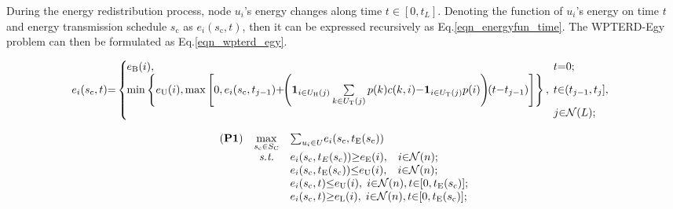 \documentclass[12pt,journal,onecolumn,draftcls]{IEEEtran}
\begin{document}
During the energy redistribution process, node $u_i$'s energy changes along time $t{\in}[0,t_{L}]$. Denoting the function of $u_i$'s energy on time $t$ and energy transmission schedule $s_\text{c}$ as $e_i(s_\text{c},t)$, then it can be expressed recursively as Eq.\eqref{eqn_energyfun_time}. The WPTERD-Egy problem can then be formulated as Eq.\eqref{eqn_wpterd_egy}.


\begin{figure}
\begin{equation}
\label{eqn_energyfun_time}
e_i(s_\text{c},t){=}\left\{
\begin{array}{ll}
\hspace{-2mm}e_\text{B}(i), \hspace{2mm}&\hspace{-2mm}t{=}0;\\
\hspace{-2mm}\min\left\{e_\text{U}(i),
\max\left[0,
e_i(s_\text{c},t_{j{-}1})
{+}\hspace{-1mm}\left(
\mathbf{1}_{i{\in}U_\text{H}(j)}
\mathop{\sum}\limits_{k{\in}U_\text{T}(j)}p(k)c(k,i)
{-}
\mathbf{1}_{i{\in}U_\text{T}(j)}p(i)
\right)
\hspace{-1mm}(t{-}t_{j{-}1})
\right]
\right\}
,&\hspace{-2mm}t{\in}(t_{j{-}1},t_j],\\
&\hspace{-2mm}j{\in}\mathcal{N}(L);
\end{array}
\right.
\end{equation}
\end{figure}


\begin{equation}
\label{eqn_wpterd_egy}
\begin{array}{rcl}
(\textbf{P1})&\mathop{\max}\limits_{s_\text{c}{\in}S_\text{C}}&{\sum}_{u_i{\in}U}e_i(s_\text{c},t_\text{E}(s_\text{c}))\\
&\textit{s.t.}&e_i(s_\text{c},t_E(s_\text{c})){\geq}e_\text{E}(i),\hspace{3mm}i{\in}\mathcal{N}(n);\\
&&e_i(s_\text{c},t_\text{E}(s_\text{c})){\leq}e_\text{U}(i),\hspace{3mm}i{\in}\mathcal{N}(n);\\
&&e_i(s_\text{c},t){\leq}e_\text{U}(i),\hspace{1mm}i{\in}\mathcal{N}(n),t{\in}[0,t_\text{E}(s_\text{c})];\\
&&e_i(s_\text{c},t){\geq}e_\text{L}(i),\hspace{1mm}i{\in}\mathcal{N}(n),t{\in}[0,t_\text{E}(s_\text{c})];
\end{array}
\end{equation}
\end{document}
